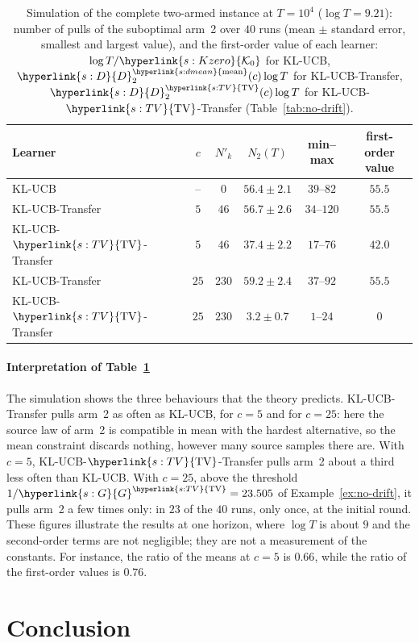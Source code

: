 \documentclass[11pt]{article}
\newcommand{\sy}[2]{{\hyperlink{#1}{#2}}}
\newcommand{\TV}{\sy{s:TV}{\mathrm{TV}}}
\newcommand{\dmean}{\sy{s:dmean}{\mathrm{mean}}}
\newcommand{\Dc}{\sy{s:D}{D}}
\newcommand{\Ko}{\sy{s:Kzero}{\mathcal{K}_{0}}}
\newcommand{\Gd}{\sy{s:G}{G}}
\begin{document}
\begin{table}[h]
\centering
\caption[Simulation of the two-armed instance]{Simulation of the complete two-armed instance at $T=10^4$ ($\log T=9.21$): number of
pulls of the suboptimal arm~2 over $40$ runs (mean $\pm$ standard error, smallest and largest
value), and the first-order value of each learner: $\log T/\Ko$ for KL-UCB,
$\Dc^{\dmean}_2(c)\log T$ for KL-UCB-Transfer, $\Dc^{\TV}_2(c)\log T$ for KL-UCB-$\TV$-Transfer
(Table~\ref{tab:no-drift}).}\label{tab:simulation}
\begin{tabular}{@{}lccccc@{}}
\toprule
Learner & $c$ & $N'_k$ & $N_2(T)$ & min--max & first-order value\\
\midrule
KL-UCB & -- & $0$ & $56.4\pm2.1$ & $39$--$82$ & $55.5$\\
KL-UCB-Transfer & $5$ & $46$ & $56.7\pm2.6$ & $34$--$120$ & $55.5$\\
KL-UCB-$\TV$-Transfer & $5$ & $46$ & $37.4\pm2.2$ & $17$--$76$ & $42.0$\\
KL-UCB-Transfer & $25$ & $230$ & $59.2\pm2.4$ & $37$--$92$ & $55.5$\\
KL-UCB-$\TV$-Transfer & $25$ & $230$ & $3.2\pm0.7$ & $1$--$24$ & $0$\\
\bottomrule
\end{tabular}
\end{table}

\paragraph{Interpretation of Table~\ref{tab:simulation}} The simulation shows the three
behaviours that the theory predicts. KL-UCB-Transfer pulls arm~2 as often as KL-UCB, for $c=5$ and
for $c=25$: here the source law of arm~2 is compatible in mean with the hardest alternative, so the
mean constraint discards nothing, however many source samples there are. With $c=5$,
KL-UCB-$\TV$-Transfer pulls arm~2 about a third less often than KL-UCB. With $c=25$, above the
threshold $1/\Gd^{\TV}=23.505$ of Example~\ref{ex:no-drift}, it pulls arm~2 a few times only: in
$23$ of the $40$ runs, only once, at the initial round. These figures illustrate the results at one
horizon, where $\log T$ is about $9$ and the second-order terms are not negligible; they are not a
measurement of the constants. For instance, the ratio of the means at $c=5$ is $0.66$, while the
ratio of the first-order values is $0.76$.

\section{Conclusion}\label{sec:conclusion}
\end{document}
